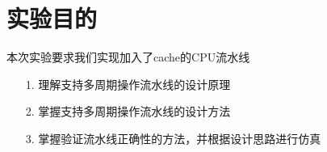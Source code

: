 \section{实验目的}
本次实验要求我们实现加入了cache的CPU流水线
\begin{itemize}
    \item [1.] 理解支持多周期操作流水线的设计原理
    \item [2.] 掌握支持多周期操作流水线的设计方法
    \item [3.] 掌握验证流水线正确性的方法，并根据设计思路进行仿真
\end{itemize}    